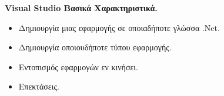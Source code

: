 \textbf{Visual Studio Βασικά Xαρακτηριστικά.}

\begin{itemize}
    \item Δημιουργία μιας εφαρμογής σε οποιαδήποτε γλώσσα .Net.
    \item Δημιουργία οποιουδήποτε τύπου εφαρμογής.
    \item Εντοπισμός εφαρμογών εν κινήσει.
    \item Επεκτάσεις.
\end{itemize}
